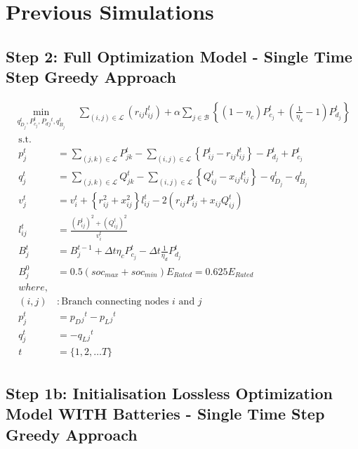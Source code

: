 \section*{Previous Simulations}
\subsection*{Step 2: Full Optimization Model - Single Time Step Greedy Approach}


\begin{gather}
    \min_{q_{D_j}^t, 
	P_{c_j}^t, P_d{_j}^t, q_{B_j}^t} \quad
	\sum_{(i, j) \in \mathcal{L}} (r_{ij}l_{ij}^t) + 
	\alpha \sum_{j \in \mathcal{B}} \left\{ (1- \eta_c)P_{c_j}^t + \left(\frac{1}{\eta_d}-1\right) P_{d_j}^t \right\} \\
	\begin{align}
		\text{s.t.} & {}\nonumber \\
		{p_j^t} & = {\sum_{(j, k) \in \mathcal{L}} P_{jk}^t - \sum_{(i, j) \in \mathcal{L}}\left\{P_{ij}^t - r_{ij}l_{ij}^t\right\} - P_{d_j}^t + P_{c_j}^t} && \\
		{q_j^t} & = {\sum_{(j, k) \in \mathcal{L}} Q_{jk}^t - \sum_{(i, j) \in \mathcal{L}}\left\{Q_{ij}^t - x_{ij}l_{ij}^t\right\} - q_{D_j}^t - q_{B_j}^t} && \\
		{v_j^t} & = {v_{i}^t +  \left\{r_{ij}^2 + x_{ij}^2\right\}l_{ij}^t - 2(r_{ij}P_{ij}^t + x_{ij}Q_{ij}^t)} && \\
		{l_{ij}^t} & = {\frac{(P_{ij}^{t})^2 + (Q_{ij}^{t})^2}{v_i^t}} \\
		{B_{j}^{t}} &= {B_{j}^{t-1} + \Delta t \eta_c P_{c_j}^t - \Delta t\frac{1}{\eta_d} P_{d_j}^t} \\
		{ B_{j}^{0} } &= { 0.5(soc_{max}+soc_{min})E_{Rated} = 0.625E_{Rated}} \\
		{where,} & {} \\
		{(i, j)} &: {\text{Branch connecting nodes $i$ and $j$}} \\
		{p_j^t} &= {p_D{_j}^t - p_L{_j}^t} \\
		{q_j^t} &= {-q_L{_j}^t} \\
		{t} &= {\{1, 2, \ldots T\}}
	\end{align}
\end{gather}

\subsection*{Step 1b: Initialisation Lossless Optimization Model WITH Batteries - Single Time Step Greedy Approach}


